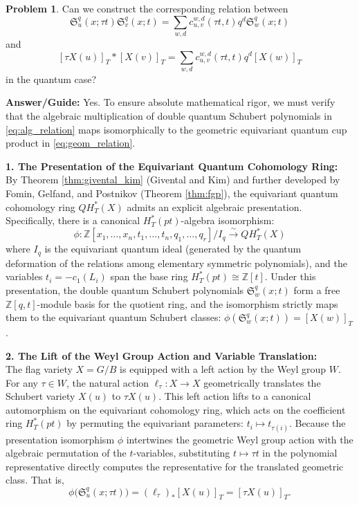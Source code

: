 \documentclass{amsart}
\theoremstyle{definition}
\newtheorem{problem}{Problem}
\begin{document}
\begin{problem}
Can we construct the corresponding relation between 
\begin{equation}\label{eq:alg_relation}
\mathfrak{S}_u^q(x; \tau t) \mathfrak{S}_v^q(x;t) = \sum_{w,d} c_{u,v}^{w,d}(\tau t, t) q^d \mathfrak{S}_w^q(x;t)
\end{equation}
and 
\begin{equation}\label{eq:geom_relation}
[\tau X(u)]_T * [X(v)]_T = \sum_{w,d} c_{u,v}^{w,d}(\tau t, t) q^d [X(w)]_T
\end{equation}
in the quantum case?
\end{problem}

\noindent\textbf{Answer/Guide:} Yes. To ensure absolute mathematical rigor, we must verify that the algebraic multiplication of double quantum Schubert polynomials in \eqref{eq:alg_relation} maps isomorphically to the geometric equivariant quantum cup product in \eqref{eq:geom_relation}.

\vspace{2mm}
\noindent\textbf{1. The Presentation of the Equivariant Quantum Cohomology Ring:}\\
By Theorem \ref{thm:givental_kim} (Givental and Kim) and further developed by Fomin, Gelfand, and Postnikov (Theorem \ref{thm:fgp}), the equivariant quantum cohomology ring $QH_T^*(X)$ admits an explicit algebraic presentation. Specifically, there is a canonical $H_T^*(pt)$-algebra isomorphism:
$$ \phi: \mathbb{Z}[x_1, \ldots, x_n, t_1, \ldots, t_n, q_1, \ldots, q_r] / I_q \xrightarrow{\sim} QH_T^*(X) $$
where $I_q$ is the equivariant quantum ideal (generated by the quantum deformation of the relations among elementary symmetric polynomials), and the variables $t_i = -c_1(L_i)$ span the base ring $H_T^*(pt) \cong \mathbb{Z}[t]$. Under this presentation, the double quantum Schubert polynomials $\mathfrak{S}_w^q(x; t)$ form a free $\mathbb{Z}[q,t]$-module basis for the quotient ring, and the isomorphism strictly maps them to the equivariant quantum Schubert classes: $\phi(\mathfrak{S}_w^q(x; t)) = [X(w)]_T$.

\vspace{2mm}
\noindent\textbf{2. The Lift of the Weyl Group Action and Variable Translation:}\\
The flag variety $X = G/B$ is equipped with a left action by the Weyl group $W$. For any $\tau \in W$, the natural action $\ell_\tau : X \to X$ geometrically translates the Schubert variety $X(u)$ to $\tau X(u)$. This left action lifts to a canonical automorphism on the equivariant cohomology ring, which acts on the coefficient ring $H_T^*(pt)$ by permuting the equivariant parameters: $t_i \mapsto t_{\tau(i)}$. 
Because the presentation isomorphism $\phi$ intertwines the geometric Weyl group action with the algebraic permutation of the $t$-variables, substituting $t \mapsto \tau t$ in the polynomial representative directly computes the representative for the translated geometric class. That is, 
$$ \phi\big(\mathfrak{S}_u^q(x; \tau t)\big) = (\ell_\tau)_* [X(u)]_T = [\tau X(u)]_T. $$
\end{document}
